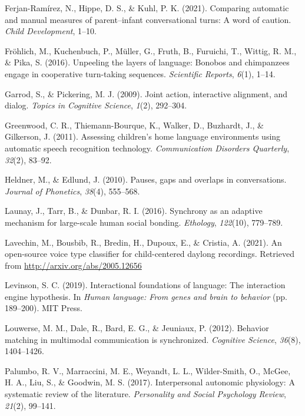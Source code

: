 \documentclass[10pt, letterpaper]{article}
\newenvironment{CSLReferences}%
  {}%
  {\par}
\begin{document}
\begin{CSLReferences}{1}{0}
\leavevmode\hypertarget{ref-ferjan2021comparing}{}%
Ferjan-Ramírez, N., Hippe, D. S., \& Kuhl, P. K. (2021). Comparing
automatic and manual measures of parent--infant conversational turns: A
word of caution. \emph{Child Development}, 1--10.

\leavevmode\hypertarget{ref-frohlich2016unpeeling}{}%
Fröhlich, M., Kuchenbuch, P., Müller, G., Fruth, B., Furuichi, T.,
Wittig, R. M., \& Pika, S. (2016). Unpeeling the layers of language:
Bonobos and chimpanzees engage in cooperative turn-taking sequences.
\emph{Scientific Reports}, \emph{6}(1), 1--14.

\leavevmode\hypertarget{ref-garrod2009joint}{}%
Garrod, S., \& Pickering, M. J. (2009). Joint action, interactive
alignment, and dialog. \emph{Topics in Cognitive Science}, \emph{1}(2),
292--304.

\leavevmode\hypertarget{ref-LENA}{}%
Greenwood, C. R., Thiemann-Bourque, K., Walker, D., Buzhardt, J., \&
Gilkerson, J. (2011). Assessing children's home language environments
using automatic speech recognition technology. \emph{Communication
Disorders Quarterly}, \emph{32}(2), 83--92.

\leavevmode\hypertarget{ref-heldner2010pauses}{}%
Heldner, M., \& Edlund, J. (2010). Pauses, gaps and overlaps in
conversations. \emph{Journal of Phonetics}, \emph{38}(4), 555--568.

\leavevmode\hypertarget{ref-launay2016synchrony}{}%
Launay, J., Tarr, B., \& Dunbar, R. I. (2016). Synchrony as an adaptive
mechanism for large-scale human social bonding. \emph{Ethology},
\emph{122}(10), 779--789.

\leavevmode\hypertarget{ref-lavechin2021vtc}{}%
Lavechin, M., Bousbib, R., Bredin, H., Dupoux, E., \& Cristia, A.
(2021). An open-source voice type classifier for child-centered daylong
recordings. Retrieved from \url{http://arxiv.org/abs/2005.12656}

\leavevmode\hypertarget{ref-levinson2019interactional}{}%
Levinson, S. C. (2019). Interactional foundations of language: The
interaction engine hypothesis. In \emph{Human language: From genes and
brain to behavior} (pp. 189--200). MIT Press.

\leavevmode\hypertarget{ref-louwerse2012behavior}{}%
Louwerse, M. M., Dale, R., Bard, E. G., \& Jeuniaux, P. (2012). Behavior
matching in multimodal communication is synchronized. \emph{Cognitive
Science}, \emph{36}(8), 1404--1426.

\leavevmode\hypertarget{ref-palumbo2017interpersonal}{}%
Palumbo, R. V., Marraccini, M. E., Weyandt, L. L., Wilder-Smith, O.,
McGee, H. A., Liu, S., \& Goodwin, M. S. (2017). Interpersonal autonomic
physiology: A systematic review of the literature. \emph{Personality and
Social Psychology Review}, \emph{21}(2), 99--141.


\end{CSLReferences}
\end{document}
